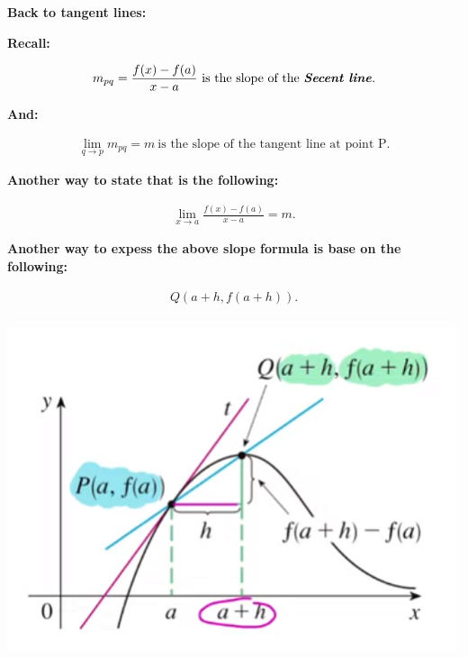 \documentclass{report}
\begin{document}
        \bigbreak \noindent \bigbreak \noindent 
        \begin{large}
            \textbf{Back to tangent lines:}
        \end{large}

        \bigbreak \noindent \bigbreak \noindent 
        \begin{center}
            \textbf{Recall:}
        \end{center}
        \begin{align*}
            m_{pq} = \frac{f(x) - f(a)}{x - a}\ \text{is the slope of the \textbf{\textit{Secent line}}} 
        .\end{align*}

        \bigbreak \noindent 
        \begin{center}
            \textbf{And:}
        \end{center}
        \begin{align*}
            \lim\limits_{q \to p}{m_{pq} = m}\ \text{is the slope of the tangent line at point P}
        .\end{align*}

        \bigbreak \noindent 
        \begin{center}
            \textbf{Another way to state that is the following:}
        \end{center}
        \begin{align*}
            \lim\limits_{x \to a}{ \frac{f(x) - f(a)}{x-a} = m }
        .\end{align*}

        \bigbreak \noindent 
        \begin{center}
            \textbf{Another way to expess the above slope formula is base on the following:}
        \end{center}

        \bigbreak \noindent 
        \begin{align*}
            Q \left(a+h, f \left(a+h\right)\right)
        .\end{align*}

        \bigbreak \noindent 
        \begin{center}
            \includegraphics[scale=0.5]{../images/20.png}
        \end{center}
\end{document}
